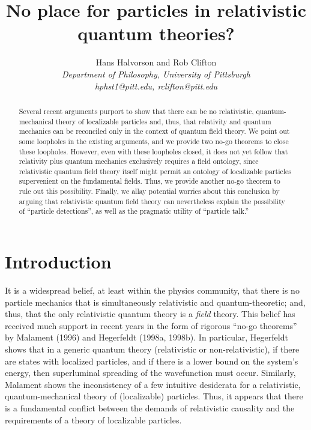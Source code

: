 \documentclass[12pt]{article}
\title{No place for particles in relativistic quantum theories?}
\author{Hans Halvorson and Rob Clifton \\
{\small {\it Department of Philosophy, University of Pittsburgh }} \\
{\small {\it hphst1@pitt.edu, rclifton@pitt.edu }}}
\date{}
\theoremstyle{remark}
\begin{document}
\maketitle 
\begin{abstract} Several recent arguments purport to show that 
  there can be no relativistic, quantum-mechanical theory of
  localizable particles and, thus, that relativity and quantum
  mechanics can be reconciled only in the context of quantum field
  theory.  We point out some loopholes in the existing arguments, and
  we provide two no-go theorems to close these loopholes.  However,
  even with these loopholes closed, it does not yet follow that
  relativity plus quantum mechanics exclusively requires a field
  ontology, since relativistic quantum field theory itself might
  permit an ontology of localizable particles supervenient on the
  fundamental fields.  Thus, we provide another no-go theorem to rule
  out this possibility.  Finally, we allay potential worries about
  this conclusion by arguing that relativistic quantum field theory
  can nevertheless explain the possibility of ``particle detections'',
  as well as the pragmatic utility of ``particle talk.''
\end{abstract}

\section{Introduction}
It is a widespread belief, at least within the physics community, that
there is no particle mechanics that is simultaneously relativistic and
quantum-theoretic; and, thus, that the only relativistic quantum
theory is a \emph{field} theory.  This belief has received much
support in recent years in the form of rigorous ``no-go theorems'' by
Malament (1996) and Hegerfeldt (1998a, 1998b).  In particular,
Hegerfeldt shows that in a generic quantum theory (relativistic or
non-relativistic), if there are states with localized particles, and
if there is a lower bound on the system's energy, then superluminal
spreading of the wavefunction must occur.  Similarly, Malament shows
the inconsistency of a few intuitive desiderata for a relativistic,
quantum-mechanical theory of (localizable) particles.  Thus, it
appears that there is a fundamental conflict between the demands of
relativistic causality and the requirements of a theory of localizable
particles.
\end{document}
